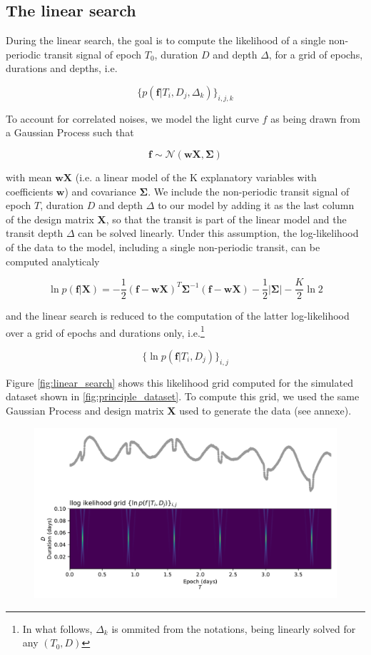 \documentclass{aastex631}
\begin{document}
\subsection{The linear search}

During the linear search, the goal is to compute the likelihood of a single non-periodic transit signal of epoch $T_0$, duration $D$ and depth $\Delta$, for a grid of epochs, durations and depths, i.e.

$$\{p(\bm{f} \vert T_i ,D_j, \Delta_k)\}_{i, j, k}$$

To account for correlated noises, we model the light curve $f$ as being drawn from a Gaussian Process such that

$$\bm{f} \sim \mathcal{N}(\bm{w X}, \bm{\Sigma})$$

with mean $\bm{wX}$ (i.e. a linear model of the K explanatory variables with coefficients $\bm{w}$) and covariance $\bm{\Sigma}$. We include the non-periodic transit signal of epoch $T$, duration $D$ and depth $\Delta$ to our model by adding it as the last column of the design matrix $\bm{X}$, so that the transit is part of the linear model and the transit depth $\Delta$ can be solved linearly. Under this assumption, the log-likelihood of the data to the model, including a single non-periodic transit, can be computed analyticaly

$$\ln p(\bm{f} \vert \bm{X}) = -\frac{1}{2}(\bm{f}-\bm{wX})^T\bm{\Sigma}^{-1}(\bm{f}-\bm{wX}) -  \frac{1}{2}\vert\bm{\Sigma}\vert - \frac{K}{2}\ln 2$$


and the linear search is reduced to the computation of the latter log-likelihood over a grid of epochs and durations only, i.e.\footnote{In what follows, $\Delta_k$ is ommited from the notations, being linearly solved for any $(T_0, D)$}


$$\{\ln p(\bm{f} \vert T_i ,D_j)\}_{i, j}$$


Figure \autoref{fig:linear_search} shows this likelihood grid computed for the simulated dataset shown in \autoref{fig:principle_dataset}. To compute this grid, we used the same Gaussian Process and design matrix $\bm{X}$ used to generate the data (see annexe).



\begin{figure}[H]
    \begin{centering}
        \includegraphics[width=0.75\linewidth]{../figures/principle_linear_search.pdf}
        \caption{}
        \label{fig:linear_search}
    \end{centering}
\end{figure}
\end{document}
